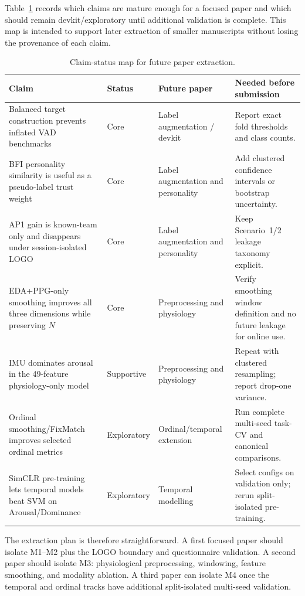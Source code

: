 \documentclass[sigconf,review,anonymous]{acmart}
\begin{document}
Table~\ref{tab:extraction_map} records which claims are mature enough for a
focused paper and which should remain devkit/exploratory until additional
validation is complete.
This map is intended to support later extraction of smaller manuscripts without
losing the provenance of each claim.

\begin{table}[t]
\caption{Claim-status map for future paper extraction.}
\label{tab:extraction_map}
\centering
\setlength{\tabcolsep}{4pt}
\small
\begin{tabular}{p{}p{}p{}p{}}
\toprule
\textbf{Claim} & \textbf{Status} & \textbf{Future paper} & \textbf{Needed before submission} \\
\midrule
Balanced target construction prevents inflated VAD benchmarks &
Core &
Label augmentation / devkit &
Report exact fold thresholds and class counts. \\
\addlinespace
BFI personality similarity is useful as a pseudo-label trust weight &
Core &
Label augmentation and personality &
Add clustered confidence intervals or bootstrap uncertainty. \\
\addlinespace
AP1 gain is known-team only and disappears under session-isolated LOGO &
Core &
Label augmentation and personality &
Keep Scenario~1/2 leakage taxonomy explicit. \\
\addlinespace
EDA+PPG-only smoothing improves all three dimensions while preserving $N$ &
Core &
Preprocessing and physiology &
Verify smoothing window definition and no future leakage for online use. \\
\addlinespace
IMU dominates arousal in the 49-feature physiology-only model &
Supportive &
Preprocessing and physiology &
Repeat with clustered resampling; report drop-one variance. \\
\addlinespace
Ordinal smoothing/FixMatch improves selected ordinal metrics &
Exploratory &
Ordinal/temporal extension &
Run complete multi-seed task-CV and canonical comparisons. \\
\addlinespace
SimCLR pre-training lets temporal models beat SVM on Arousal/Dominance &
Exploratory &
Temporal modelling &
Select configs on validation only; rerun split-isolated pre-training. \\
\bottomrule
\end{tabular}
\end{table}

The extraction plan is therefore straightforward.
A first focused paper should isolate M1--M2 plus the LOGO boundary and
questionnaire validation.
A second paper should isolate M3: physiological preprocessing, windowing,
feature smoothing, and modality ablation.
A third paper can isolate M4 once the temporal and ordinal tracks have
additional split-isolated multi-seed validation.
\end{document}
